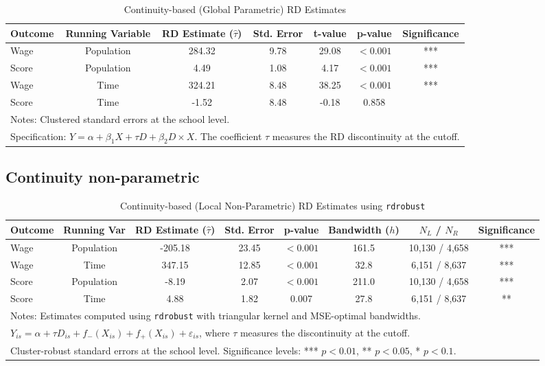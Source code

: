 \documentclass{article}
\begin{document}
\begin{table}[H]
\centering
\caption{Continuity-based (Global Parametric) RD Estimates}
\label{tab:global_rd}
\begin{tabular}{lcccccc}
\hline
Outcome & Running Variable & RD Estimate ($\hat{\tau}$) & Std. Error & t-value & p-value & Significance \\
\hline
Wage   & Population & 284.32 & 9.78 & 29.08 & $<0.001$ & *** \\
Score  & Population & 4.49   & 1.08 & 4.17  & $<0.001$ & *** \\
Wage   & Time       & 324.21 & 8.48 & 38.25 & $<0.001$ & *** \\
Score  & Time       & -1.52  & 8.48 & -0.18 & 0.858 &  \\
\hline
\multicolumn{7}{l}{\footnotesize Notes: Clustered standard errors at the school level.} \\
\multicolumn{7}{l}{\footnotesize Specification: $Y = \alpha + \beta_1 X + \tau D + \beta_2 D\times X$. The coefficient $\tau$ measures the RD discontinuity at the cutoff.}\\
\end{tabular}
\end{table}



\subsection{Continuity non-parametric}


\begin{table}[H]
\centering
\caption{Continuity-based (Local Non-Parametric) RD Estimates using \texttt{rdrobust}}
\label{tab:local_rd}
\begin{tabular}{lccccccc}
\hline
Outcome & Running Var & RD Estimate ($\hat{\tau}$) & Std. Error & p-value & Bandwidth ($h$) & $N_L$ / $N_R$ & Significance \\
\hline
Wage   & Population & -205.18 & 23.45 & $<0.001$ & 161.5 & 10,130 / 4,658 & *** \\
Wage   & Time       & 347.15  & 12.85 & $<0.001$ & 32.8  & 6,151 / 8,637  & *** \\
Score  & Population & -8.19   & 2.07  & $<0.001$ & 211.0 & 10,130 / 4,658 & *** \\
Score  & Time       & 4.88    & 1.82  & 0.007 & 27.8 & 6,151 / 8,637 & ** \\
\hline
\multicolumn{8}{l}{\footnotesize Notes: Estimates computed using \texttt{rdrobust} with triangular kernel and MSE-optimal bandwidths.}\\
\multicolumn{8}{l}{\footnotesize $Y_{is} = \alpha + \tau D_{is} + f_-(X_{is}) + f_+(X_{is}) + \varepsilon_{is}$, where $\tau$ measures the discontinuity at the cutoff.}\\
\multicolumn{8}{l}{\footnotesize Cluster-robust standard errors at the school level. Significance levels: *** $p<0.01$, ** $p<0.05$, * $p<0.1$.}\\
\end{tabular}
\end{table}
\end{document}
